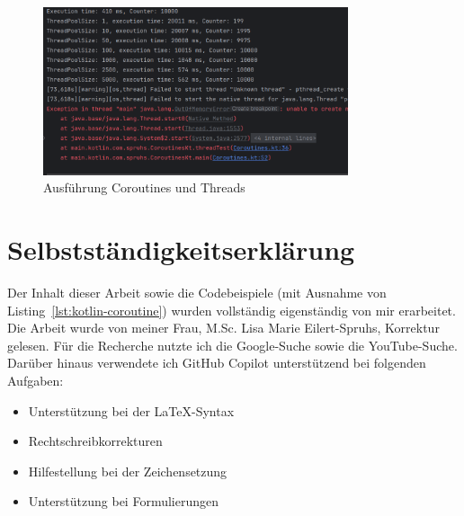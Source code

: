 \documentclass[11pt]{article}
\begin{document}
    \begin{figure}[h]
        \centering
        \includegraphics[width=0.8\textwidth]{pictures/Bildschirmfoto vom 2025-04-08 20-09-18}
        \caption{Ausführung Coroutines und Threads}
        \label{fig:coroutines-threads}
    \end{figure}

    \clearpage

    \section{Selbstständigkeitserklärung}
    
    Der Inhalt dieser Arbeit sowie die Codebeispiele (mit Ausnahme von Listing~\ref{lst:kotlin-coroutine}) wurden vollständig eigenständig von mir erarbeitet.
    Die Arbeit wurde von meiner Frau, M.Sc. Lisa Marie Eilert-Spruhs, Korrektur gelesen.
    Für die Recherche nutzte ich die Google-Suche sowie die YouTube-Suche.
    Darüber hinaus verwendete ich GitHub Copilot unterstützend bei folgenden Aufgaben:
    \begin{itemize}
        \item Unterstützung bei der LaTeX-Syntax
        \item Rechtschreibkorrekturen
        \item Hilfestellung bei der Zeichensetzung
        \item Unterstützung bei Formulierungen
    \end{itemize}
\end{document}
